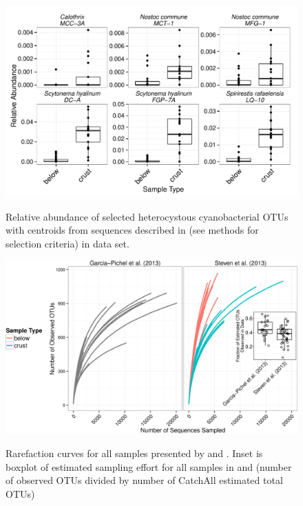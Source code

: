 \begin{figure}[H]
  \centering
  \caption{Relative abundance of selected heterocystous cyanobacterial OTUs with centroids from sequences described in \citet{Yeager} (see methods for selection criteria) in \citet{Steven_2013} data set.}
    \includegraphics[width=1.0\textwidth]{figures/het_cyano_steven2013/het_cyano_steven2013.pdf}
  \label{fig:het_steven}
\end{figure}

\begin{figure}[H]
  \centering
  \caption{Rarefaction curves for all samples presented by \citet{Garcia_Pichel_2013} and \citet{Steven_2013}. Inset is boxplot of estimated sampling effort for all samples in \citet{Garcia_Pichel_2013} and \citet{Steven_2013} (number of observed OTUs divided by number of CatchAll \cite{BUNGE_2010} estimated total OTUs)}
    \includegraphics[width=1.0\textwidth]{figures/rarefacation_curves1/raref_and_boxplot.png}
  \label{fig:rarefaction}
\end{figure}

